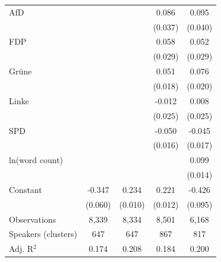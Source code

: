\begin{table}[htbp]
\begin{tabular}{l*{4}{c}}
AfD                 &                     &                     &       0.086\sym{**} &       0.095\sym{**} \\
                    &                     &                     &     (0.037)         &     (0.040)         \\
\addlinespace
FDP                 &                     &                     &       0.058\sym{**} &       0.052\sym{*}  \\
                    &                     &                     &     (0.029)         &     (0.029)         \\
\addlinespace
Grüne               &                     &                     &       0.051\sym{***}&       0.076\sym{***}\\
                    &                     &                     &     (0.018)         &     (0.020)         \\
\addlinespace
Linke               &                     &                     &      -0.012         &       0.008         \\
                    &                     &                     &     (0.025)         &     (0.025)         \\
\addlinespace
SPD                 &                     &                     &      -0.050\sym{***}&      -0.045\sym{***}\\
                    &                     &                     &     (0.016)         &     (0.017)         \\
\addlinespace
ln(word count)      &                     &                     &                     &       0.099\sym{***}\\
                    &                     &                     &                     &     (0.014)         \\
\addlinespace
Constant            &      -0.347\sym{***}&       0.234\sym{***}&       0.221\sym{***}&      -0.426\sym{***}\\
                    &     (0.060)         &     (0.010)         &     (0.012)         &     (0.095)         \\
\midrule
Observations        &       8,339         &       8,334         &       8,501         &       6,168         \\
Speakers (clusters) &         647         &         647         &         867         &         817         \\
Adj. R$^2$          &       0.174         &       0.208         &       0.184         &       0.200         \\

\end{tabular}
\end{table}
